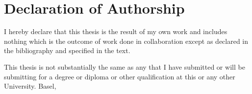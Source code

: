 \chapter{Declaration of Authorship}
\label{DeclarationOfAuthorship}
I hereby declare that this thesis is the result of my own work and includes nothing which is the outcome of work done in collaboration except as declared in the bibliography and specified in the text.

This thesis is not substantially the same as any that I have submitted or will be submitting for a degree or diploma or other qualification at this or any other University.
\newline
\newline
\newline
\newline
Basel, \@date
\newline
\newline
\begin{flushright}
\authorsint
\end{flushright}

